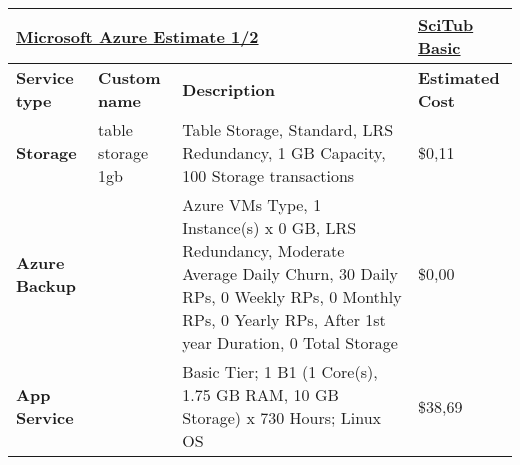 %

\begin{adjustbox}{angle=90}
                \begin{tabularx}{\textheight}{|l|X|X|X|}
                \hline
                \multicolumn{3}{|l|}{{\ul \textbf{Microsoft Azure Estimate 1/2}}}                     & {\ul \textbf{SciTub Basic}}                         \\ \hline
                \textbf{Service type}             & \textbf{Custom name}      & \textbf{Description}                                                                                                                                                                                                                             & \textbf{Estimated Cost}                  \\ \hline\hline
                \textbf{Storage}                  & table storage 1gb         & Table Storage, Standard, LRS Redundancy, 1 GB Capacity, 100 Storage transactions                                                                                                                                                                 & \$0,11                                   \\ \hline
                \textbf{Azure Backup}             &                           & Azure VMs Type, 1 Instance(s) x 0 GB, LRS Redundancy, Moderate Average Daily Churn, 30 Daily RPs, 0 Weekly RPs, 0 Monthly RPs, 0 Yearly RPs,  After 1st year Duration, 0 Total Storage                                                           & \$0,00                                   \\ \hline
                \textbf{App Service}              &                           & Basic Tier; 1 B1 (1 Core(s), 1.75 GB RAM, 10 GB Storage) x 730 Hours; Linux OS                                                                                                                                                                   & \$38,69                                  \\ \hline

\end{tabularx}
\end{adjustbox}
